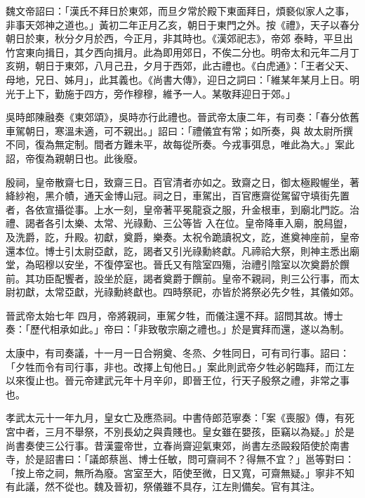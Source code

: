 \begin{pinyinscope}
 魏文帝詔曰：「漢氏不拜日於東郊，而旦夕常於殿下東面拜日，煩褻似家人之事，非事天郊神之道也。」黃初二年正月乙亥，朝日于東門之外。按《禮》，天子以春分朝日於東，秋分夕月於西，今正月，非其時也。《漢郊祀志》，帝郊
 泰畤，平旦出竹宮東向揖日，其夕西向揖月。此為即用郊日，不俟二分也。明帝太和元年二月丁亥朔，朝日于東郊，八月己丑，夕月于西郊，此古禮也。《白虎通》：「王者父天、母地，兄日、姊月」，此其義也。《尚書大傳》，迎日之詞曰：「維某年某月上日。明光于上下，勤施于四方，旁作穆穆，維予一人。某敬拜迎日于郊。」



 吳時郎陳融奏《東郊頌》，吳時亦行此禮也。晉武帝太康二年，有司奏：「春分依舊車駕朝日，寒溫未適，可不親出。」詔曰：「禮儀宜有常；如所奏，與
 故太尉所撰不同，復為無定制。間者方難未平，故每從所奏。今戎事弭息，唯此為大。」案此詔，帝復為親朝日也。此後廢。



 殷祠，皇帝散齋七日，致齋三日。百官清者亦如之。致齋之日，御太極殿幄坐，著絳紗袍，黑介幘，通天金博山冠。祠之日，車駕出，百官應齋從駕留守填街先置者，各依宣攝從事。上水一刻，皇帝著平冕龍袞之服，升金根車，到廟北門訖。治禮、謁者各引太樂、太常、光祿勳、三公等皆
 入在位。皇帝降車入廟，脫舄盥，及洗爵，訖，升殿。初獻，奠爵，樂奏。太祝令跪讀祝文，訖，進奠神座前，皇帝還本位。博士引太尉亞獻，訖，謁者又引光祿勳終獻。凡禘祫大祭，則神主悉出廟堂，為昭穆以安坐，不復停室也。晉氏又有陰室四殤，治禮引陰室以次奠爵於饌前。其功臣配饗者，設坐於庭，謁者奠爵于饌前。皇帝不親祠，則三公行事，而太尉初獻，太常亞獻，光祿勳終獻也。四時祭祀，亦皆於將祭必先夕牲，其儀如郊。



 晉武帝太始七年
 四月，帝將親祠，車駕夕牲，而儀注還不拜。詔問其故。博士奏：「歷代相承如此。」帝曰：「非致敬宗廟之禮也。」於是實拜而還，遂以為制。



 太康中，有司奏議，十一月一日合朔奠、冬烝、夕牲同日，可有司行事。詔曰：「夕牲而令有司行事，非也。改擇上旬他日。」案此則武帝夕牲必躬臨拜，而江左以來復止也。晉元帝建武元年十月辛卯，即晉王位，行天子殷祭之禮，非常之事也。



 孝武太元十一年九月，皇女亡及應烝祠。中書侍郎范寧奏：「案《喪服》傳，有死
 宮中者，三月不舉祭，不別長幼之與貴賤也。皇女雖在嬰孩，臣竊以為疑。」於是尚書奏使三公行事。昔漢靈帝世，立春尚齋迎氣東郊，尚書左丞毆殺陌使於南書寺，於是詔書曰：「議郎蔡邕、博士任敏，問可齋祠不？得無不宜？」邕等對曰：「按上帝之祠，無所為廢。宮室至大，陌使至微，日又寬，可齋無疑。」寧非不知有此議，然不從也。魏及晉初，祭儀雖不具存，江左則備矣。官有其注。




\end{pinyinscope}
